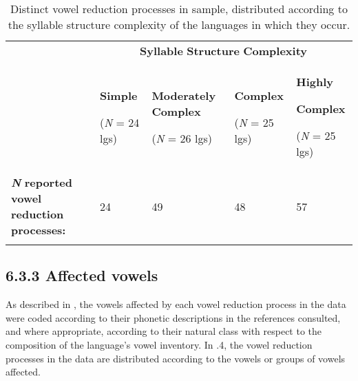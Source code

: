 \begin{table}
\begin{tabularx}{\textwidth}{XXXXX}
\lsptoprule
 & \multicolumn{4}{c}{ \textbf{Syllable} \textbf{Structure} \textbf{Complexity}}\\
& { \textbf{Simple}}

 (\textit{N} = 24 lgs) & { \textbf{Moderately} \textbf{Complex}}

 (\textit{N} = 26 lgs) & { \textbf{Complex}}

 (\textit{N} = 25 lgs) & { \textbf{Highly} }

{ \textbf{Complex}}

 (\textit{N} = 25 lgs)\\
 \textbf{\textit{N}} \textbf{reported} \textbf{vowel} \textbf{reduction} \textbf{processes:} & 24 & 49 & 48 & 57\\
\lspbottomrule
\end{tabularx}
\caption{\label{6.3}Distinct vowel reduction processes in sample, distributed according to the syllable structure complexity of the languages in which they occur.}
\end{table}

\subsection{6.3.3 Affected vowels}

  As described in , the vowels affected by each vowel reduction process in the data were coded according to their phonetic descriptions in the references consulted, and where appropriate, according to their natural class with respect to the composition of the language’s vowel inventory. In .4, the vowel reduction processes in the data are distributed according to the vowels or groups of vowels affected.

